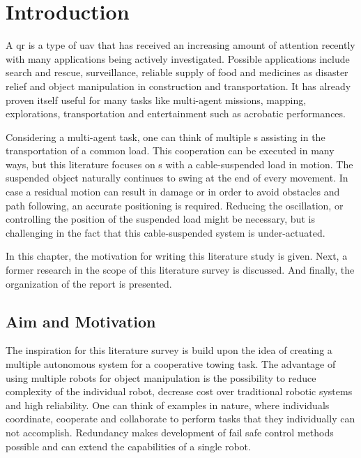     \chapter{Introduction} \label{ch:intro}

    		A \acf{qr} is a type of \acf{uav} that has received an increasing amount of attention recently with many applications being actively investigated. Possible applications include search and rescue, surveillance, reliable supply of food and medicines as disaster relief and object manipulation in construction and transportation. It has already proven itself useful for many tasks like multi-agent missions, mapping, explorations, transportation and entertainment such as acrobatic performances.
    
    		Considering a multi-agent task, one can think of multiple s assisting in the transportation of a common load. This cooperation can be executed in many ways, but this literature focuses on s with a cable-suspended load in motion. The suspended object naturally continues to swing at the end of every movement. In case a residual motion can result in damage or in order to avoid obstacles and path following, an accurate positioning is required. Reducing the oscillation, or controlling the position of the suspended load might be necessary, but is challenging in the fact that this cable-suspended system is under-actuated.
    
    		In this chapter, the motivation for writing this literature study is given. Next, a former research in the scope of this literature survey is discussed. And finally, the organization of the report is presented.
    
    		\section{Aim and Motivation}\label{sec:int.motivation}
    				The inspiration for this literature survey is build upon the idea of creating a multiple autonomous  system for a cooperative towing task. The advantage of using multiple robots for object manipulation is the possibility to reduce complexity of the individual robot, decrease cost over traditional robotic systems and high reliability. One can think of examples in nature, where individuals coordinate, cooperate and collaborate to perform tasks that they individually can not accomplish. Redundancy makes development of fail safe control methods possible and can extend the capabilities of a single robot. 						
    				
